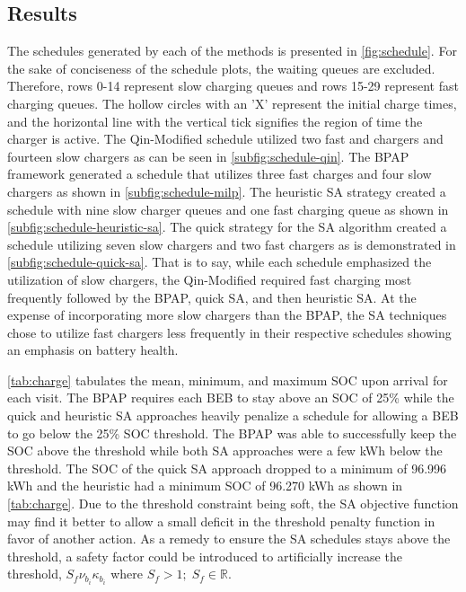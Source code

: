 \documentclass[energies,article,submit,moreauthors]{Definitions/mdpi}
\begin{document}
\subsection{Results}
\label{sec:sa-results}
The schedules generated by each of the methods is presented in \ref{fig:schedule}. For the sake of conciseness of the
schedule plots, the waiting queues are excluded. Therefore, rows 0-14 represent slow charging queues and rows 15-29
represent fast charging queues. The hollow circles with an 'X' represent the initial charge times, and the horizontal
line with the vertical tick signifies the region of time the charger is active. The Qin-Modified schedule utilized two
fast and chargers and fourteen slow chargers as can be seen in \ref{subfig:schedule-qin}. The BPAP framework generated a
schedule that utilizes three fast charges and four slow chargers as shown in \ref{subfig:schedule-milp}. The heuristic
SA strategy created a schedule with nine slow charger queues and one fast charging queue as shown in
\ref{subfig:schedule-heuristic-sa}. The quick strategy for the SA algorithm created a schedule utilizing seven slow
chargers and two fast chargers as is demonstrated in \ref{subfig:schedule-quick-sa}. That is to say, while each schedule
emphasized the utilization of slow chargers, the Qin-Modified required fast charging most frequently followed by the
BPAP, quick SA, and then heuristic SA. At the expense of incorporating more slow chargers than the BPAP, the SA
techniques chose to utilize fast chargers less frequently in their respective schedules showing an emphasis on battery
health.

\ref{tab:charge} tabulates the mean, minimum, and maximum SOC upon arrival for each visit. The BPAP requires each BEB to stay
above an SOC of 25\% while the quick and heuristic SA approaches heavily penalize a schedule for allowing a BEB to go
below the 25\% SOC threshold. The BPAP was able to successfully keep the SOC above the threshold while both SA approaches
were a few kWh below the threshold. The SOC of the quick SA approach dropped to a minimum of 96.996 kWh and the
heuristic had a minimum SOC of 96.270 kWh as shown in \ref{tab:charge}. Due to the threshold constraint being soft, the SA
objective function may find it better to allow a small deficit in the threshold penalty function in favor of another
action. As a remedy to ensure the SA schedules stays above the threshold, a safety factor could be introduced to
artificially increase the threshold, \(S_f \nu_{b_i}\kappa_{b_i}\) where \(S_f > 1;\; S_f \in \mathbb{R}\).
\end{document}

